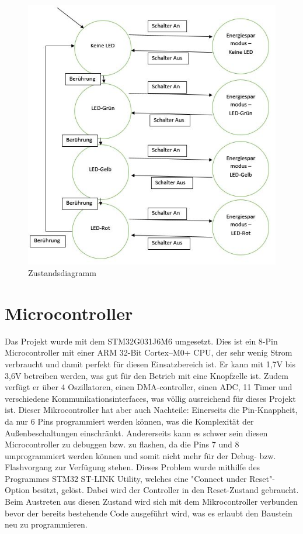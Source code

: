 \documentclass[a4paper,
DIV=13,
12pt,
BCOR=10mm,
department=FakEI,
parskip=half,
automark,
]{article}
\begin{document}
\begin{figure}[!hbpt]
 \begin{center} \includegraphics[width=1.2\textwidth]{Zustandsdiagramm.jpg}
 \caption{Zustandsdiagramm}
 \label{fig:Register}
  \end{center}
\end{figure}



\newpage
\section{Microcontroller}

Das Projekt wurde mit dem STM32G031J6M6 umgesetzt. Dies ist ein 8-Pin Microcontroller mit einer ARM 32-Bit Cortex–M0+ CPU, der sehr wenig Strom verbraucht und damit perfekt für diesen Einsatzbereich ist. Er kann mit 1,7V bis 3,6V betreiben werden, was gut für den Betrieb mit eine Knopfzelle ist. Zudem verfügt er über 4 Oszillatoren, einen DMA-controller, einen ADC, 11 Timer und verschiedene Kommunikationsinterfaces, was völlig ausreichend für dieses Projekt ist. Dieser Mikrocontroller hat aber auch Nachteile: Einerseits die Pin-Knappheit, da nur 6 Pins programmiert werden können, was die Komplexität der Außenbeschaltungen einschränkt. Andererseits kann es schwer sein diesen Microcontroller zu debuggen bzw. zu flashen, da die Pins 7 und 8 umprogrammiert werden können und somit nicht mehr für der Debug- bzw. Flashvorgang zur Verfügung stehen. Dieses Problem wurde mithilfe des Programmes STM32 ST-LINK Utility, welches eine "Connect under Reset"-Option besitzt, gelöst. Dabei wird der Controller in den Reset-Zustand gebraucht. Beim Austreten aus diesen Zustand wird sich mit dem Mikrocontroller verbunden bevor der bereits bestehende Code ausgeführt wird, was es erlaubt den Baustein neu zu programmieren.
\end{document}
